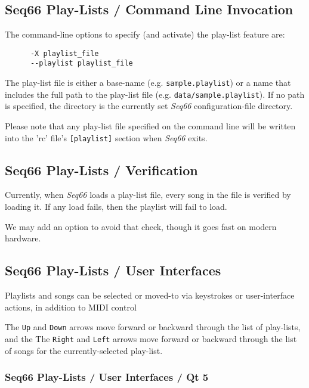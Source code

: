 \subsection{Seq66 Play-Lists / Command Line Invocation}
\label{subsec:playlist_cmd_line}

   The command-line options to specify (and activate) the play-list feature
   are:

   \begin{verbatim}
      -X playlist_file
      --playlist playlist_file
   \end{verbatim}

   The play-list file is either a base-name (e.g. \texttt{sample.playlist})
   or a name that includes the full path to the play-list file
   (e.g. \texttt{data/sample.playlist}).
   If no path is specified, the directory is the currently set
   \textsl{Seq66} configuration-file directory.

   Please note that any play-list file specified on the command line
   will be written into the 'rc' file's \texttt{[playlist]} section when
   \textsl{Seq66} exits.

\subsection{Seq66 Play-Lists / Verification}
\label{subsec:playlist_verify}

   Currently, when \textsl{Seq66} loads a play-list file, every
   song in the file is verified by loading it.  If any load fails, then
   the playlist will fail to load.

   We may add an option to avoid that check, though it goes fast on
   modern hardware.

\subsection{Seq66 Play-Lists / User Interfaces}
\label{subsec:playlist_uis}

   Playlists and songs can be selected or moved-to via keystrokes or
   user-interface actions, in addition to MIDI control

   The \texttt{Up} and \texttt{Down} arrows move forward or backward through
   the list of play-lists, and the
   The \texttt{Right} and \texttt{Left} arrows move forward or backward through
   the list of songs for the currently-selected play-list.

\subsubsection{Seq66 Play-Lists / User Interfaces / Qt 5}
\label{subsubsec:playlist_ui_qt}

